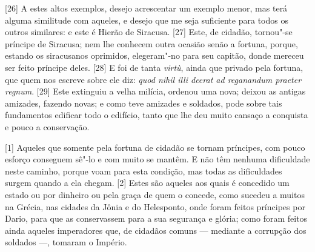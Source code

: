 {[}26{]} A estes altos exemplos, desejo acrescentar um exemplo menor,
mas terá alguma similitude com aqueles, e desejo que me seja suficiente
para todos os outros similares: e este é Hierão de Siracusa. {[}27{]} Este, de cidadão, tornou"-se príncipe de
Siracusa; nem lhe conhecem outra ocasião senão a fortuna, porque,
estando os siracusanos oprimidos, elegeram"-no para seu capitão, donde
mereceu ser feito príncipe deles. {[}28{]} E foi de tanta \emph{virtù},
ainda que privado pela fortuna, que quem nos escreve sobre ele diz:
\emph{quod nihil illi deerat ad reganandum praeter regnum}. {[}29{]} Este extinguiu a
velha milícia, ordenou uma nova; deixou as antigas amizades, fazendo
novas; e como teve amizades e soldados, pode sobre tais fundamentos
edificar todo o edifício, tanto que lhe deu muito cansaço a conquista e
pouco a conservação.


{[}1{]} Aqueles que somente pela fortuna de cidadão se tornam príncipes,
com pouco esforço conseguem sê"-lo e com muito se mantêm. E não têm
nenhuma dificuldade neste caminho, porque voam para esta condição, mas todas as dificuldades
surgem quando a ela chegam. {[}2{]} Estes são aqueles aos quais é
concedido um estado ou por dinheiro ou pela graça de quem o concede,
como sucedeu a muitos na Grécia, nas cidades da Jônia e do
Helesponto, onde foram feitos príncipes por Dario, para que as
conservassem para a sua segurança e glória; como foram feitos ainda
aqueles imperadores que, de cidadãos comuns --- mediante a corrupção dos
soldados ---, tomaram o Império.

